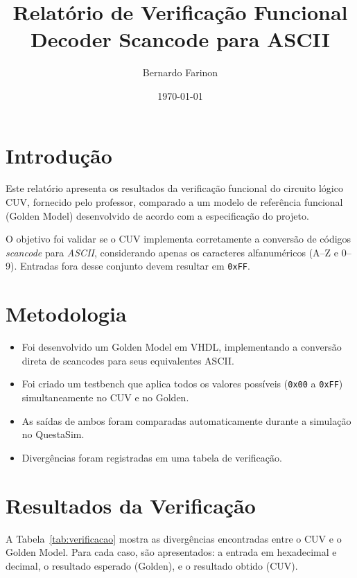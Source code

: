\documentclass[12pt,a4paper]{article}
\title{Relatório de Verificação Funcional \\ 
Decoder Scancode para ASCII}
\author{Bernardo Farinon}
\date{\today}
\begin{document}
\maketitle

\section{Introdução}
Este relatório apresenta os resultados da verificação funcional do circuito lógico 
CUV, fornecido pelo professor, 
comparado a um modelo de referência funcional (Golden Model)
desenvolvido de acordo com a especificação do projeto. 

O objetivo foi validar se o CUV implementa corretamente a conversão de códigos 
\textit{scancode} para \textit{ASCII}, considerando apenas os caracteres alfanuméricos 
(A--Z e 0--9). Entradas fora desse conjunto devem resultar em \texttt{0xFF}. 

\section{Metodologia}
\begin{itemize}
    \item Foi desenvolvido um Golden Model em VHDL, implementando a conversão direta 
    de scancodes para seus equivalentes ASCII.
    \item Foi criado um testbench que aplica todos os valores possíveis 
    (\texttt{0x00} a \texttt{0xFF}) simultaneamente no CUV e no Golden.
    \item As saídas de ambos foram comparadas automaticamente durante a simulação no QuestaSim.
    \item Divergências foram registradas em uma tabela de verificação.
\end{itemize}

\section{Resultados da Verificação}
A Tabela~\ref{tab:verificacao} mostra as divergências encontradas entre o CUV 
e o Golden Model. Para cada caso, são apresentados: a entrada em hexadecimal e decimal, 
o resultado esperado (Golden), e o resultado obtido (CUV).
\end{document}
